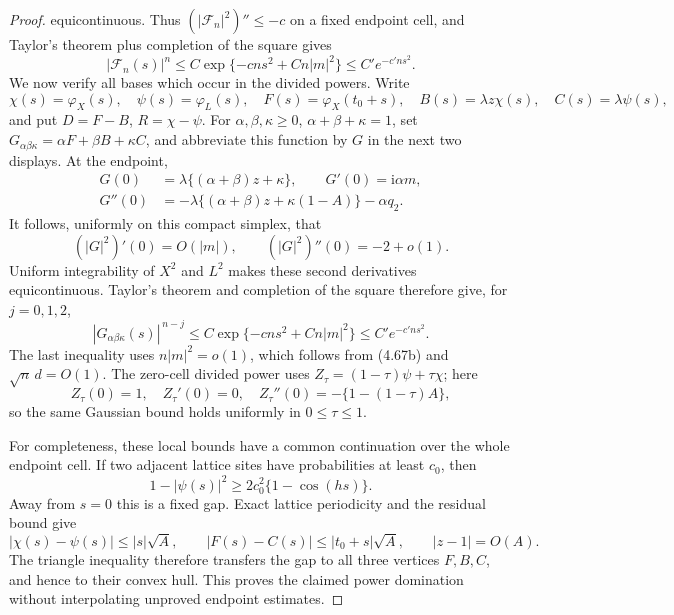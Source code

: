 \documentclass[11pt,a4paper]{article}
\numberwithin{equation}{section}
\theoremstyle{definition}
\theoremstyle{remark}
\newcommand{\ii}{\mathrm i}
\begin{document}
\begin{proof}
equicontinuous.  Thus \((|\mathscr F_n|^2)''\le-c\) on a fixed endpoint
cell, and
Taylor's theorem plus completion of the square gives
\[
 |\mathscr F_n(s)|^n\le C\exp\{-cns^2+Cn|m|^2\}
       \le C'e^{-c'ns^2}.                                  \tag{4.67e3}
\]
We now verify all bases which occur in the divided powers.  Write
\[
 \chi(s)=\varphi_X(s),\quad \psi(s)=\varphi_L(s),\quad
 F(s)=\varphi_X(t_0+s),\quad B(s)=\lambda z\chi(s),\quad
 C(s)=\lambda\psi(s),
\]
and put $D=F-B$, $R=\chi-\psi$.  For
\(\alpha,\beta,\kappa\ge0\), \(\alpha+\beta+\kappa=1\), set
\(G_{\alpha\beta\kappa}=\alpha F+\beta B+\kappa C\), and abbreviate this
function by \(G\) in the next two displays.  At the endpoint,
\[
 \begin{split}
 G(0)&=\lambda\{(\alpha+\beta)z+\kappa\},\qquad
 G'(0)=\ii\alpha m,\\
 G''(0)&=-\lambda\{(\alpha+\beta)z+\kappa(1-A)\}-\alpha q_2.
 \end{split}                                                    \tag{4.67e4}
\]
It follows, uniformly on this compact simplex, that
\[
 (|G|^2)'(0)=O(|m|),\qquad (|G|^2)''(0)=-2+o(1).          \tag{4.67e5}
\]
Uniform integrability of $X^2$ and $L^2$ makes these second derivatives
equicontinuous.  Taylor's theorem and completion of the square therefore
give, for $j=0,1,2$,
\[
 |G_{\alpha\beta\kappa}(s)|^{\,n-j}
 \le C\exp\{-cns^2+Cn|m|^2\}\le C'e^{-c'ns^2}.          \tag{4.67e6}
\]
The last inequality uses
\(n|m|^2=o(1)\), which follows from (4.67b) and
\(\sqrt n\,d=O(1)\).  The zero-cell divided power uses
 \(Z_\tau=(1-\tau)\psi+\tau\chi\); here
\[
 Z_\tau(0)=1,\quad Z_\tau'(0)=0,\quad
 Z_\tau''(0)=-\{1-(1-\tau)A\},
\]
so the same Gaussian bound holds uniformly in \(0\le\tau\le1\).

For completeness, these local bounds have a common continuation over the
whole endpoint cell.  If two adjacent lattice sites have probabilities at
least $c_0$, then
\[
 1-|\psi(s)|^2\ge2c_0^2\{1-\cos(hs)\}.                 \tag{4.67e7}
\]
Away from $s=0$ this is a fixed gap.  Exact lattice periodicity and the
residual bound give
\[
 |\chi(s)-\psi(s)|\le |s|\sqrt A,\qquad
 |F(s)-C(s)|\le |t_0+s|\sqrt A,\qquad |z-1|=O(A).
\]
The triangle inequality therefore transfers the gap to all three vertices
\(F,B,C\), and hence to their convex hull.  This proves the claimed
power domination without interpolating unproved endpoint estimates.


\end{proof}
\end{document}
